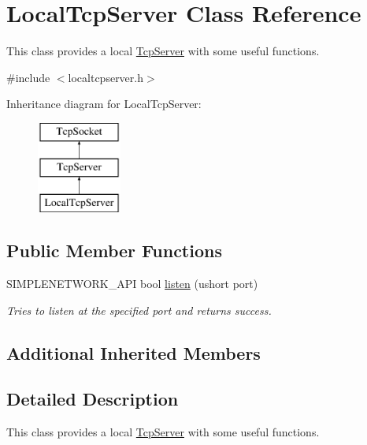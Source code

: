 \hypertarget{class_local_tcp_server}{}\section{Local\+Tcp\+Server Class Reference}
\label{class_local_tcp_server}


This class provides a local \mbox{\hyperlink{class_tcp_server}{Tcp\+Server}} with some useful functions.  




{\ttfamily \#include $<$localtcpserver.\+h$>$}

Inheritance diagram for Local\+Tcp\+Server\+:\begin{figure}[H]
\begin{center}
\leavevmode
\includegraphics[height=3.000000cm]{class_local_tcp_server}
\end{center}
\end{figure}
\subsection*{Public Member Functions}
\begin{DoxyCompactItemize}
\item 
S\+I\+M\+P\+L\+E\+N\+E\+T\+W\+O\+R\+K\+\_\+\+A\+PI bool \mbox{\hyperlink{class_local_tcp_server_a47116fc33d74d8b3a9b472af6ce8d32d}{listen}} (ushort port)
\begin{DoxyCompactList}\small\item\em Tries to listen at the specified port and returns success. \end{DoxyCompactList}\end{DoxyCompactItemize}
\subsection*{Additional Inherited Members}


\subsection{Detailed Description}
This class provides a local \mbox{\hyperlink{class_tcp_server}{Tcp\+Server}} with some useful functions. 


